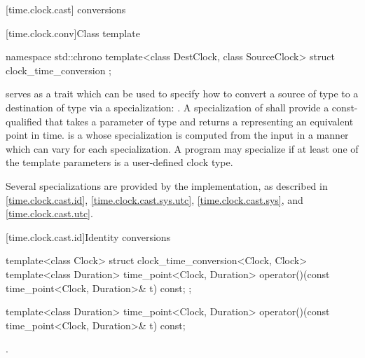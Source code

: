 [time.clock.cast]{ conversions}

[time.clock.conv]{Class template }
%

\begin{codeblock}
namespace std::chrono {
  template<class DestClock, class SourceClock>
  struct clock_time_conversion {};
}
\end{codeblock}

\pnum
{} serves as a trait
which can be used to specify how to convert
a source  of type
to a destination  of type
via a specialization:
.
A specialization of 
shall provide a const-qualified 
that takes a parameter of type 
and returns a 
representing an equivalent point in time.
 is a 
whose specialization is computed from the input 
in a manner which can vary for each  specialization.
A program may specialize 
if at least one of the template parameters is a user-defined clock type.

\pnum
Several specializations are provided by the implementation,
as described in
\ref{time.clock.cast.id},
\ref{time.clock.cast.sys.utc},
\ref{time.clock.cast.sys}, and
\ref{time.clock.cast.utc}.

[time.clock.cast.id]{Identity conversions}

\begin{codeblock}
template<class Clock>
struct clock_time_conversion<Clock, Clock> {
  template<class Duration>
    time_point<Clock, Duration>
      operator()(const time_point<Clock, Duration>& t) const;
};
\end{codeblock}

%
\begin{itemdecl}
template<class Duration>
  time_point<Clock, Duration>
    operator()(const time_point<Clock, Duration>& t) const;
\end{itemdecl}

\begin{itemdescr}
\pnum
\returns
{}.
\end{itemdescr}


